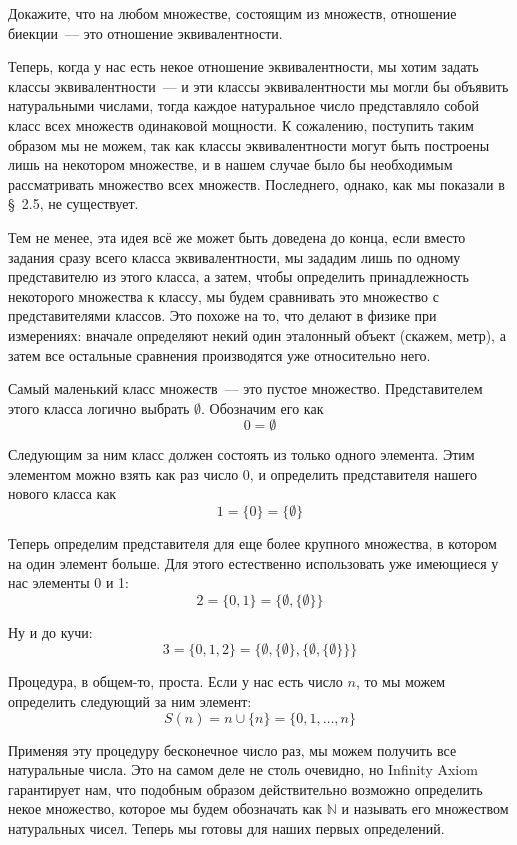 \begin{exercise}
Докажите, что на любом множестве, состоящим из множеств, отношение биекции~--- это отношение эквивалентности.
\end{exercise}

Теперь, когда у нас есть некое отношение эквивалентности, мы хотим задать классы эквивалентности~--- и эти классы эквивалентности мы могли бы объявить натуральными числами, тогда каждое натуральное число представляло собой класс всех множеств одинаковой мощности. К сожалению, поступить таким образом мы не можем, так как классы эквивалентности могут быть построены лишь на некотором множестве, и в нашем случае было бы необходимым рассматривать множество всех множеств. Последнего, однако, как мы показали в \S~2.5, не существует.

Тем не менее, эта идея всё же может быть доведена до конца, если вместо задания сразу всего класса эквивалентности, мы зададим лишь по одному представителю из этого класса, а затем, чтобы определить принадлежность некоторого множества к классу, мы будем сравнивать это множество с представителями классов. Это похоже на то, что делают в физике при измерениях: вначале определяют некий один эталонный объект (скажем, метр), а затем все остальные сравнения производятся уже относительно него.

Самый маленький класс множеств~--- это пустое множество. Представителем этого класса логично выбрать $\emptyset$. Обозначим его как $$0 = \emptyset$$

Следующим за ним класс должен состоять из только одного элемента. Этим элементом можно взять как раз число 0, и определить представителя нашего нового класса как $$1 = \{0\} = \{\emptyset\}$$

Теперь определим представителя для еще более крупного множества, в котором на один элемент больше. Для этого естественно использовать уже имеющиеся у нас элементы 0 и 1: $$2 = \{0, 1\} = \{\emptyset, \{\emptyset\}\}$$

Ну и до кучи: $$3 = \{0, 1, 2\} = \{\emptyset, \{\emptyset\}, \{\emptyset, \{\emptyset\}\}\}$$

Процедура, в общем-то, проста. Если у нас есть число $n$, то мы можем определить следующий за ним элемент: $$S(n) = n \cup \{n\} = \{0, 1, \ldots, n\}$$

Применяя эту процедуру бесконечное число раз, мы можем получить все натуральные числа. Это на самом деле не столь очевидно, но Infinity Axiom гарантирует нам, что подобным образом действительно возможно определить некое множество, которое мы будем обозначать как $\mathbb{N}$ и называть его множеством натуральных чисел. Теперь мы готовы для наших первых определений.

